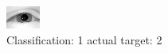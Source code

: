 \begin{figure}[h!]
\begin{center}
\includegraphics[width=0.60\columnwidth]{figures/ID2365_class_1_target_2.png}
\end{center}
\caption{ Classification: 1 actual target: 2}
\label{fig:ID2365_class_1_target_2}
\end{figure}
